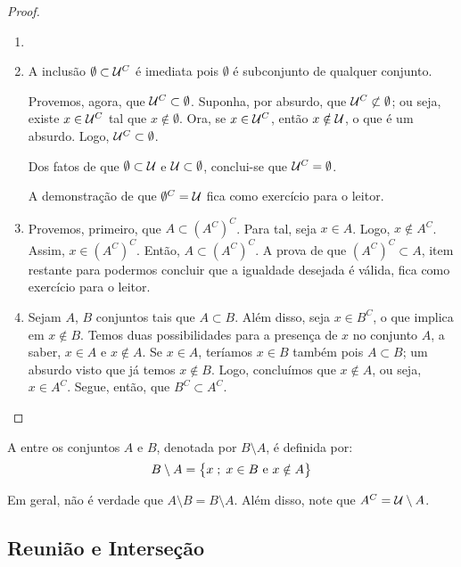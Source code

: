 \begin{proof}
\begin{enumerate}
\item[]
\item A inclusão $\emptyset \subset \mathcal{U}^C$ é imediata pois $\emptyset$ é subconjunto de qualquer conjunto. 

Provemos, agora, que $\mathcal{U}^C \subset \emptyset$. Suponha, por absurdo, que $\mathcal{U}^C \not\subset \emptyset$; ou seja, existe $x \in \mathcal{U}^C$ tal que $x \notin \emptyset$. Ora, se $x \in \mathcal{U}^C$, então $x \notin \mathcal{U}$, o que é um absurdo. Logo, $\mathcal{U}^C \subset \emptyset$.

Dos fatos de que $\emptyset \subset \mathcal{U}$ e $\mathcal{U} \subset \emptyset$, conclui-se que $\mathcal{U}^C = \emptyset$.

A demonstração de que $\emptyset^C = \mathcal{U}$ fica como exercício para o leitor.

\item Provemos, primeiro, que $A \subset (A^C)^C$. Para tal, seja $x \in A$. Logo, $x \notin A^C$. Assim, $x \in (A^C)^C$. Então, $A \subset (A^C)^C$. A prova de que $(A^C)^C \subset A$, item restante para podermos concluir que a igualdade desejada é válida, fica como exercício para o leitor.

\item Sejam $A$, $B$ conjuntos tais que $A \subset B$. Além disso, seja $x \in B^C$, o que implica em $x \notin B$. Temos duas possibilidades para a presença de $x$ no conjunto $A$, a saber, $x \in A$ e $x \notin A$. Se $x \in A$, teríamos $x \in B$ também pois $A \subset B$; um absurdo visto que já temos $x \notin B$. Logo, concluímos que $x \notin A$, ou seja, $x \in A^C$. Segue, então, que $B^C \subset A^C$.
\end{enumerate}
\end{proof}

\begin{definition}
A  entre os conjuntos $A$ e $B$, denotada por $B\setminus A$, é definida por:
%
\[
B \setminus A = \left\{x \;;\; x \in B \text{ e } x \notin A\right\}
\]
\end{definition}

\begin{remark}
Em geral, não é verdade que $A \setminus B = B \setminus A$. Além disso, note que $A^C = \mathcal{U}\setminus A$.
\end{remark}


\subsection{Reunião e Interseção}

